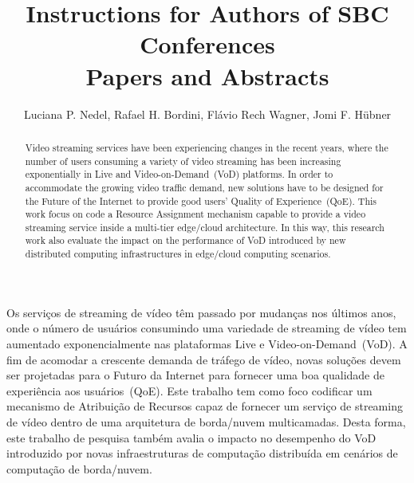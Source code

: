 \documentclass[12pt]{article}
\title{Instructions for Authors of SBC Conferences\\ Papers and Abstracts}
\author{Luciana P. Nedel\inst{1}, Rafael H. Bordini\inst{2}, Flávio Rech
  Wagner\inst{1}, Jomi F. Hübner\inst{3} }
\begin{document}
 

\maketitle

\begin{abstract}
Video streaming services have been experiencing changes in the recent years, where the number of users consuming a variety of video streaming has been increasing exponentially in Live and Video-on-Demand~(VoD) platforms. In order to accommodate the growing video traffic demand, new solutions have to be designed for the Future of the Internet to provide good users' Quality of Experience~(QoE). This work focus on code a Resource Assignment mechanism capable to provide a video streaming service inside a multi-tier edge/cloud architecture. In this way, this research work also evaluate the impact on the performance of VoD introduced by new distributed computing infrastructures in edge/cloud computing scenarios.
\end{abstract}
     
\begin{resumo} 
Os serviços de streaming de vídeo têm passado por mudanças nos últimos anos, onde o número de usuários consumindo uma variedade de streaming de vídeo tem aumentado exponencialmente nas plataformas Live e Video-on-Demand~(VoD). A fim de acomodar a crescente demanda de tráfego de vídeo, novas soluções devem ser projetadas para o Futuro da Internet para fornecer uma boa qualidade de experiência aos usuários~(QoE). Este trabalho tem como foco codificar um mecanismo de Atribuição de Recursos capaz de fornecer um serviço de streaming de vídeo dentro de uma arquitetura de borda/nuvem multicamadas. Desta forma, este trabalho de pesquisa também avalia o impacto no desempenho do VoD introduzido por novas infraestruturas de computação distribuída em cenários de computação de borda/nuvem.
\end{resumo}


















\end{document}
